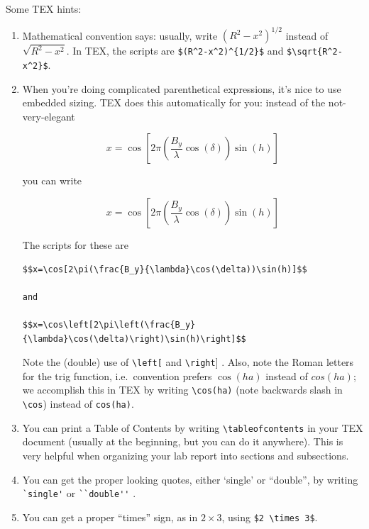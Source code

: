 \documentclass[12pt,preprint]{aastex}
\begin{document}
	Some TEX hints: \begin{enumerate}

	\item Mathematical convention says: usually, write
$(R^2-x^2)^{1/2}$ instead of $\sqrt{R^2-x^2}$.  In TEX, the scripts are
\verb&$(R^2-x^2)^{1/2}$& and \verb&$\sqrt{R^2-x^2}$&. 

	\item When you're doing complicated parenthetical expressions,
it's nice to use embedded sizing. TEX does this automatically for you:
instead of the not-very-elegant

$$x=\cos[2\pi(\frac{B_y}{\lambda}\cos(\delta))\sin(h)]$$

\noindent you can write

$$x=\cos\left[2\pi\left(\frac{B_y}{\lambda}\cos(\delta)\right)\sin(h)\right]$$

\noindent The scripts for these are

\begin{verbatim} 
$$x=\cos[2\pi(\frac{B_y}{\lambda}\cos(\delta))\sin(h)]$$

and

$$x=\cos\left[2\pi\left(\frac{B_y}{\lambda}\cos(\delta)\right)\sin(h)\right]$$
\end{verbatim}

\noindent Note the (double) use of \verb$\left[$ and \verb$\right$] . 
Also, note the Roman letters for the trig function, i.e.\ convention
prefers $\cos(ha)$ instead of $cos(ha)$; we accomplish this in TEX by
writing \verb$\cos(ha)$ (note backwards slash in \verb$\cos$) instead of
\verb$cos(ha)$. 

\item You can print a Table of Contents by writing
\verb$\tableofcontents$ in your TEX document (usually at the beginning,
but you can do it anywhere). This is very helpful when
organizing your lab report into sections and subsections.

\item You can get the proper looking quotes, either `single' or
``double'', by writing \verb$`single'$ or \verb$``double''$ . 

\item You can get a proper ``times'' sign, as in $2 \times 3$, using
\verb=$2 \times 3$=. 


\end{enumerate}
\end{document}
